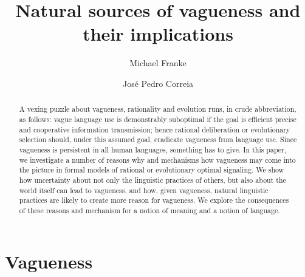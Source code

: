 \documentclass[a4paper]{article}
\begin{document}
\title{Natural sources of vagueness and their implications}
\author{Michael Franke \and Jos\'e Pedro Correia}
\date{}

\maketitle

\begin{abstract}
A vexing puzzle about vagueness, rationality and evolution runs, in crude abbreviation, as follows: vague language use is demonstrably suboptimal if the goal is efficient precise and cooperative information transmission; hence rational deliberation or evolutionary selection should, under this assumed goal, eradicate vagueness from language use.
Since vagueness is persistent in all human languages, something has to give.
In this paper, we investigate a number of reasons why and mechanisms how vagueness may come into the picture in formal models of rational or evolutionary optimal signaling.
We show how uncertainty about not only the linguistic practices of others, but also about the world itself can lead to vagueness, and how, given vagueness, natural linguistic practices are likely to create more reason for vagueness.
We explore the consequences of these reasons and mechanism for a notion of meaning and a notion of language.
\end{abstract}

\tableofcontents

\section{Vagueness}
\label{sec:vagueness}
\end{document}
